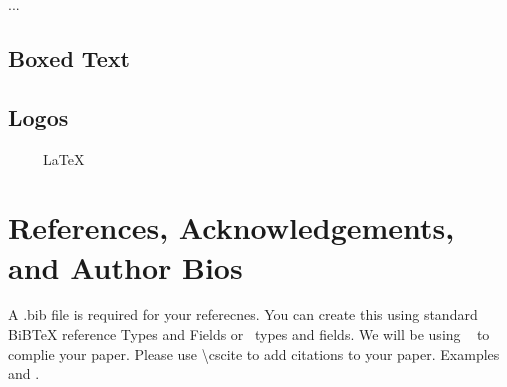 \documentclass{csmagazine}
\begin{document}
\begin{flushleft}
...

\subsection{Boxed Text}



\subsection{Logos}

\AllTeX ~ \BibLaTeX ~ \XeLaTeX ~ \LaTeX 

\section{References, Acknowledgements, and Author Bios}

A .bib file is required for your referecnes. You can create this using standard BiBTeX reference Types and Fields or \BibLaTeX~types and fields. We will be using \BibLaTeX~ to complie your paper. Please use \textbackslash{}cscite{} to add citations to your paper. Examples  and .







\printbibliography[heading=none]











\end{flushleft}
\end{document}
